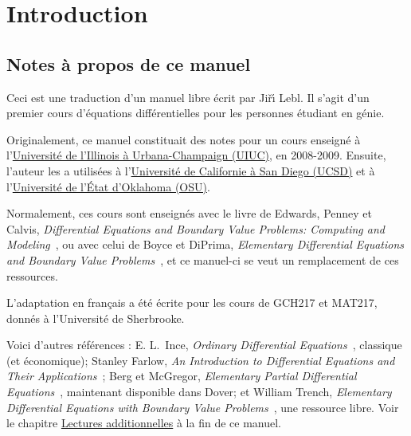  \chapter*{Introduction} \label{intro:chapter}


\section{Notes à propos de ce manuel}
\label{notes:section}

Ceci est une traduction d'un manuel libre écrit par Ji\v{r}\'{\i} Lebl.
Il s'agit d'un premier cours d'équations différentielles pour les personnes étudiant en génie.


Originalement, ce manuel constituait des notes pour un cours enseigné à l'\href{https://www.math.uiuc.edu/}{Université de l'Illinois à Urbana-Champaign (UIUC)}, en 2008-2009. Ensuite, l'auteur les a utilisées à l'\href{https://www.math.ucsd.edu/}{Université de Californie à San Diego (UCSD)} et à l'\href{https://math.okstate.edu/}{Université de l'État d'Oklahoma (OSU)}.

Normalement, ces cours sont enseignés avec le livre de Edwards, Penney et Calvis,
\emph{Differential Equations and Boundary Value Problems: Computing and Modeling}~\cite{EP}, ou avec celui de Boyce et DiPrima,
\emph{Elementary Differential Equations and Boundary Value Problems}~\cite{BD}, et ce manuel-ci se veut un remplacement de ces ressources.

L'adaptation en français a été écrite pour les cours de GCH217 et MAT217, donnés à l'Université de Sherbrooke.

Voici d'autres références :
E. L.\ Ince, \emph{Ordinary Differential Equations}~\cite{I}, classique (et économique);
Stanley Farlow, \emph{An Introduction to Differential Equations and Their Applications}~\cite{F};
Berg et McGregor, \emph{Elementary Partial Differential Equations}~\cite{BM}, maintenant disponible dans Dover;
et William Trench, \emph{Elementary Differential Equations with Boundary Value Problems}~\cite{T}, une ressource libre.
Voir le chapitre \hyperref[furtherreading:chapter]{Lectures additionnelles} à la fin de ce manuel.

